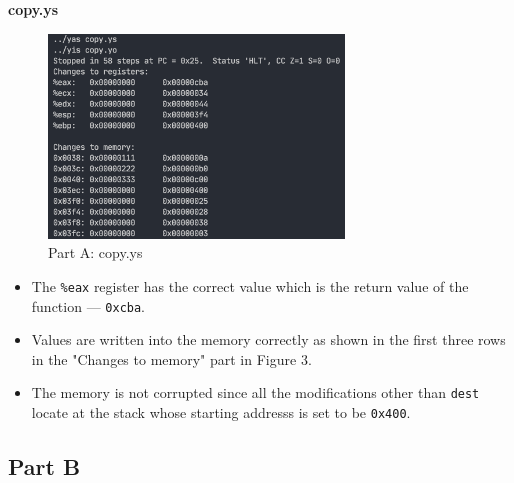 \documentclass[12pt,a4paper]{article}
\begin{document}
\textbf{copy.ys}\\

\begin{figure}[H] %
        \centering %
        \includegraphics[width=0.7\textwidth]{partA-copy-bz.png} %
        \caption{Part A: copy.ys} %
        \label{Fig.partA-copy} %
\end{figure}

\begin{itemize}
        \item The \texttt{\%eax} register has the correct value which is the return value of the function --- \texttt{0xcba}.
        \item Values are written into the memory correctly as shown in the first three rows in the "Changes to memory" part in Figure 3.
        \item The memory is not corrupted since all the modifications other than \texttt{dest} locate at the stack whose starting addresss is set to be \texttt{0x400}.
\end{itemize}
\pagebreak
\subsection{Part B}
\end{document}

